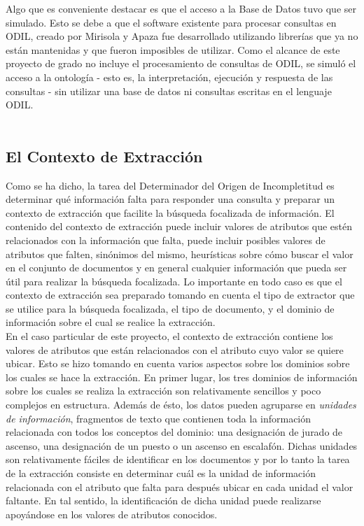 Algo que es conveniente destacar es que el acceso a la Base de Datos tuvo que ser simulado. Esto se debe a que el software existente para procesar consultas en ODIL, creado por Mirisola y Apaza \cite{implementacionODIL} fue desarrollado utilizando librerías que ya no están mantenidas y que fueron imposibles de utilizar. Como el alcance de este proyecto de grado no incluye el procesamiento de consultas de ODIL, se simuló el acceso a la ontología - esto es, la interpretación, ejecución y respuesta de las consultas - sin utilizar una base de datos ni consultas escritas en el lenguaje ODIL. \\

\\

\subsection{El Contexto de Extracción}\label{sect:diseno-extCont}

Como se ha dicho, la tarea del Determinador del Origen de Incompletitud es determinar qué información falta para responder una consulta y preparar un contexto de extracción que facilite la búsqueda focalizada de información. El contenido del contexto de extracción puede incluir valores de atributos que estén relacionados con la información que falta, puede incluir posibles valores de atributos que falten, sinónimos del mismo, heurísticas sobre cómo buscar el valor en el conjunto de documentos y en general cualquier información que pueda ser útil para realizar la búsqueda focalizada. Lo importante en todo caso es que el contexto de extracción sea preparado tomando en cuenta el tipo de extractor que se utilice para la búsqueda focalizada, el tipo de documento, y el dominio de información sobre el cual se realice la extracción.\\

En el caso particular de este proyecto, el contexto de extracción contiene los valores de atributos que están relacionados con el atributo cuyo valor se quiere ubicar. Esto se hizo tomando en cuenta varios aspectos sobre los dominios sobre los cuales se hace la extracción. En primer lugar, los tres dominios de información sobre los cuales se realiza la extracción son relativamente sencillos y poco complejos en estructura. Además de ésto, los datos pueden agruparse en \emph{unidades de información}, fragmentos de texto que contienen toda la información relacionada con todos los conceptos del dominio: una designación de jurado de ascenso, una designación de un puesto o un ascenso en escalafón. Dichas unidades son relativamente fáciles de identificar en los documentos y por lo tanto la tarea de la extracción consiste en determinar cuál es la unidad de información relacionada con el atributo que falta para después ubicar en cada unidad el valor faltante. En tal sentido, la identificación de dicha unidad puede realizarse apoyándose en los valores de atributos conocidos. \\

